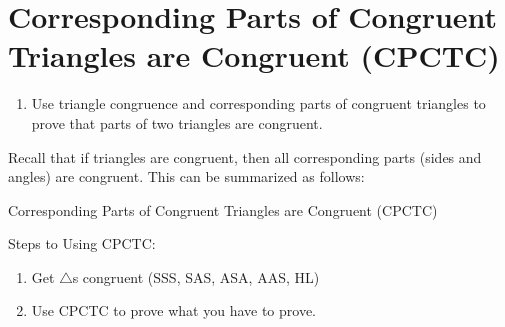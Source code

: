 \documentclass{article}
\begin{document}
\section*{Corresponding Parts of Congruent Triangles are Congruent (CPCTC)}

\begin{tcolorbox}[colframe=orange!70!white, coltitle=black, title=\textbf{Today I Can}]
\begin{enumerate}
    \item Use triangle congruence and corresponding parts of congruent triangles to prove that parts of two triangles are congruent.
\end{enumerate}
\end{tcolorbox}
\bigskip 

Recall that if triangles are congruent, then all corresponding parts (sides and angles) are congruent. This can be summarized as follows:
\begin{center}
Corresponding Parts of Congruent Triangles are Congruent (CPCTC)
\end{center}

Steps to Using CPCTC:
\begin{enumerate}
    \item Get $\triangle$s congruent (SSS, SAS, ASA, AAS, HL)
    \item Use CPCTC to prove what you have to prove.
\end{enumerate}
\end{document}
